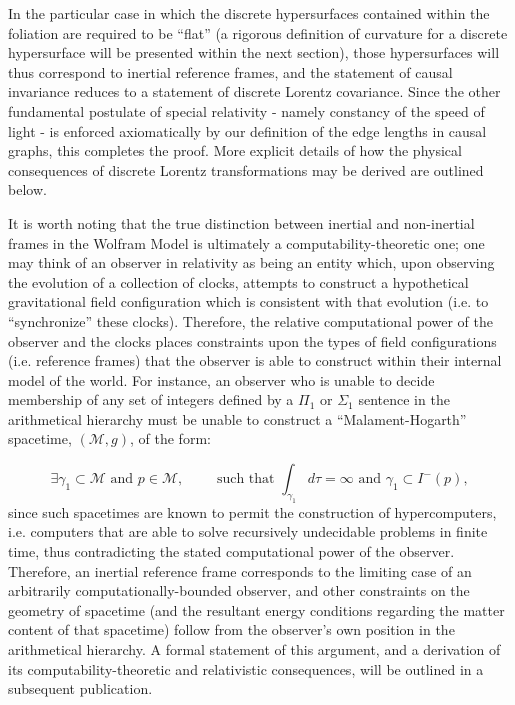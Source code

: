 \documentclass{article}
\begin{document}
In the particular case in which the discrete hypersurfaces contained within the foliation are required to be ``flat'' (a rigorous definition of curvature for a discrete hypersurface will be presented within the next section), those hypersurfaces will thus correspond to inertial reference frames, and the statement of causal invariance reduces to a statement of discrete Lorentz covariance. Since the other fundamental postulate of special relativity - namely constancy of the speed of light - is enforced axiomatically by our definition of the edge lengths in causal graphs, this completes the proof. More explicit details of how the physical consequences of discrete Lorentz transformations may be derived are outlined below.

It is worth noting that the true distinction between inertial and non-inertial frames in the Wolfram Model is ultimately a computability-theoretic one; one may think of an observer in relativity as being an entity which, upon observing the evolution of a collection of clocks, attempts to construct a hypothetical gravitational field configuration which is consistent with that evolution (i.e. to ``synchronize'' these clocks). Therefore, the relative computational power of the observer and the clocks places constraints upon the types of field configurations (i.e. reference frames) that the observer is able to construct within their internal model of the world. For instance, an observer who is unable to decide membership of any set of integers defined by a ${\Pi_1}$ or ${\Sigma_1}$ sentence in the arithmetical hierarchy must be unable to construct a ``Malament-Hogarth'' spacetime, ${\left( \mathcal{M}, g \right)}$, of the form:

\begin{equation}
\exists \gamma_1 \subset \mathcal{M} \text{ and } p \in \mathcal{M}, \qquad \text{ such that } \int_{\gamma_1} d \tau = \infty \text{ and } \gamma_1 \subset I^{-} \left( p \right),
\end{equation}
since such spacetimes are known to permit the construction of hypercomputers, i.e. computers that are able to solve recursively undecidable problems in finite time\cite{welch}\cite{hogarth}\cite{hogarth2}\cite{hogarth3}, thus contradicting the stated computational power of the observer. Therefore, an inertial reference frame corresponds to the limiting case of an arbitrarily computationally-bounded observer, and other constraints on the geometry of spacetime (and the resultant energy conditions regarding the matter content of that spacetime) follow from the observer's own position in the arithmetical hierarchy. A formal statement of this argument, and a derivation of its computability-theoretic and relativistic consequences, will be outlined in a subsequent publication.
\end{document}
